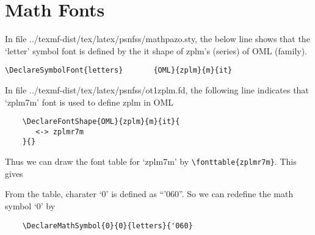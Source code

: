 \documentclass[10pt,a4paper,extrafontsizes,oldfontcommands,oneside]{memoir}
\begin{document}


\clearpage
\section{Math Fonts}

In file ../texmf-dist/tex/latex/psnfss/mathpazo.sty, the below line shows that the `letter' symbol font is defined by the it shape of zplm's (series) of OML (family).
\begin{verbatim}
\DeclareSymbolFont{letters}       {OML}{zplm}{m}{it}
\end{verbatim}

In file ../texmf-dist/tex/latex/psnfss/ot1zplm.fd, the following line indicates that `zplm7m' font is used to define zplm in OML
\begin{verbatim}
	\DeclareFontShape{OML}{zplm}{m}{it}{
	   <-> zplmr7m
	}{}
\end{verbatim}

Thus we can draw the font table for `zplm7m' by \verb+\fonttable{zplmr7m}+. This gives

From the table, charater `0' is defined as ``'060''. So we can redefine the math symbol `0' by
\begin{verbatim}
	\DeclareMathSymbol{0}{0}{letters}{'060}
\end{verbatim}

\clearpage
\end{document}

